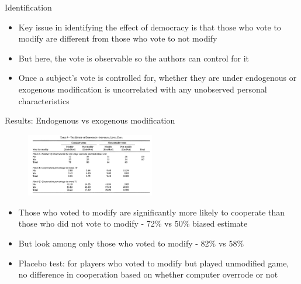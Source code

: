 \documentclass[11pt,notes=hide,aspectratio=169,mathserif]{beamer}
\begin{document}
\begin{frame}{Identification}
\begin{itemize}
     \item Key issue in identifying the effect of democracy is that those who vote to modify are different from those who vote to not modify
    \pause \item But here, the vote is observable so the authors can control for it
    \pause \item Once a subject’s vote is controlled for, whether they are under endogenous or exogenous modification is uncorrelated with any unobserved personal characteristics
\end{itemize}
\end{frame}

\begin{frame}{Results: Endogenous vs exogenous modification}
\begin{figure}
\centering
\includegraphics[width=0.5\textwidth]{inputs/table4.png}
\end{figure}
\begin{itemize}
    \pause \item Those who voted to modify are significantly more likely to cooperate than those who did not vote to modify - 72\% vs 50\% biased estimate 
    \pause \item But look among only those who voted to modify - 82\% vs 58\% 
    \pause \item Placebo test: for players who voted to modify but played unmodified game, no difference in cooperation based on whether computer overrode or not
\end{itemize}
\end{frame}
\end{document}
